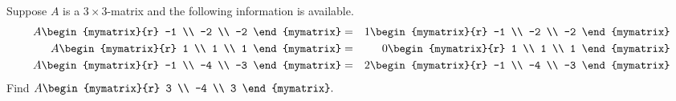 \begin{enumialphparenastyle}
\begin{ex} Suppose $A$ is a $3\times 3$-matrix and the following information is
available.
\begin{eqnarray*}
A\begin{mymatrix}{r}
-1 \\
-2 \\
-2
\end{mymatrix} &=&1\begin{mymatrix}{r}
-1 \\
-2 \\
-2
\end{mymatrix} \\
A\begin{mymatrix}{r}
1 \\
1 \\
1
\end{mymatrix} &=& 0\begin{mymatrix}{r}
1 \\
1 \\
1
\end{mymatrix} \\
A\begin{mymatrix}{r}
-1 \\
-4 \\
-3
\end{mymatrix} &=&2\begin{mymatrix}{r}
-1 \\
-4 \\
-3
\end{mymatrix}
\end{eqnarray*}
Find $A\begin{mymatrix}{r}
3 \\
-4 \\
3
\end{mymatrix}. $
\end{ex}


\end{enumialphparenastyle}
